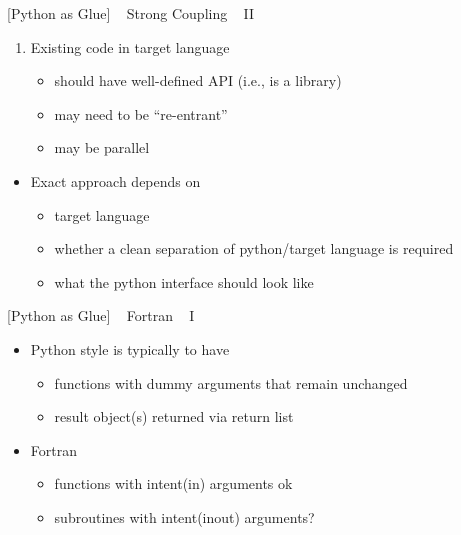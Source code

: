 \documentclass{article}
\begin{document}
    {[}Python as Glue{]} ~ Strong Coupling ~ II

\begin{enumerate}
\def\labelenumi{\arabic{enumi}.}
\itemsep1pt\parskip0pt
\item
  Existing code in target language

  \begin{itemize}
  \itemsep1pt\parskip0pt
  \item
    should have well-defined API (i.e., is a library)
  \item
    may need to be ``re-entrant''
  \item
    may be parallel
  \end{itemize}
\end{enumerate}

\begin{itemize}
\itemsep1pt\parskip0pt
\item
  Exact approach depends on

  \begin{itemize}
  \itemsep1pt\parskip0pt
  \item
    target language
  \item
    whether a clean separation of python/target language is required
  \item
    what the python interface should look like
  \end{itemize}
\end{itemize}

    {[}Python as Glue{]} ~ Fortran ~ I

\begin{itemize}
\itemsep1pt\parskip0pt
\item
  Python style is typically to have

  \begin{itemize}
  \itemsep1pt\parskip0pt
  \item
    functions with dummy arguments that remain unchanged
  \item
    result object(s) returned via return list
  \end{itemize}
\item
  Fortran

  \begin{itemize}
  \itemsep1pt\parskip0pt
  \item
    functions with intent(in) arguments ok
  \item
    subroutines with intent(inout) arguments?
  \end{itemize}
\end{itemize}
\end{document}
